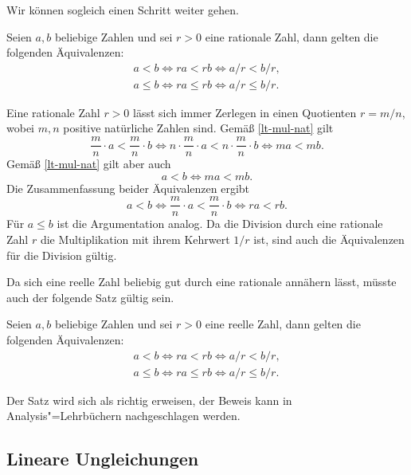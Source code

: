 Wir können sogleich einen Schritt weiter gehen.
\begin{Satz}
Seien $a,b$ beliebige Zahlen und sei $r>0$ eine rationale Zahl,
dann gelten die folgenden Äquivalenzen:
\begin{gather}
\label{lt-mul-rat} a<b\iff ra<rb\iff a/r<b/r,\\
\label{lt-mul-rat} a\le b\iff ra\le rb\iff a/r\le b/r.
\end{gather}
\end{Satz}

\noindent{}
Eine rationale Zahl $r>0$ lässt sich immer Zerlegen in einen Quotienten
$r=m/n$, wobei $m,n$ positive natürliche Zahlen sind. Gemäß
\eqref{lt-mul-nat} gilt
\begin{equation}
\frac{m}{n}\cdot a<\frac{m}{n}\cdot b
\iff n\cdot\frac{m}{n}\cdot a<n\cdot\frac{m}{n}\cdot b
\iff ma<mb.
\end{equation}
Gemäß \eqref{lt-mul-nat} gilt aber auch
\begin{equation}
a<b\iff ma<mb.
\end{equation}
Die Zusammenfassung beider Äquivalenzen ergibt
\begin{equation}
a<b\iff \frac{m}{n}\cdot a<\frac{m}{n}\cdot b\iff ra<rb.
\end{equation}
Für $a\le b$ ist die Argumentation analog. Da die Division durch
eine rationale Zahl $r$ die Multiplikation mit ihrem Kehrwert $1/r$ ist,
sind auch die Äquivalenzen für die Division gültig.\;\qedsymbol

Da sich eine reelle Zahl beliebig gut durch eine rationale annähern
lässt, müsste auch der folgende Satz gültig sein.

\begin{Satz}
Seien $a,b$ beliebige Zahlen und sei $r>0$ eine reelle Zahl,
dann gelten die folgenden Äquivalenzen:
\begin{gather}
\label{lt-mul-real} a<b\iff ra<rb\iff a/r<b/r,\\
\label{lt-mul-real} a\le b\iff ra\le rb\iff a/r\le b/r.
\end{gather}
\end{Satz}

\noindent
Der Satz wird sich als richtig erweisen, der Beweis kann in
Analysis"=Lehrbüchern nachgeschlagen werden.

\subsection{Lineare Ungleichungen}

